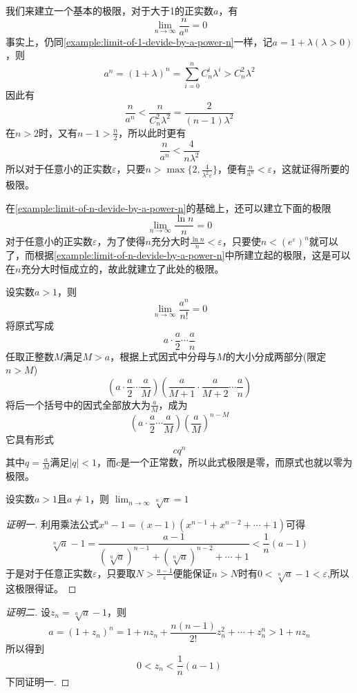 \begin{example}
  \label{example:limit-of-n-devide-by-a-power-n}
  我们来建立一个基本的极限，对于大于1的正实数$a$，有
  \[ \lim_{n \to \infty} \frac{n}{a^n} = 0 \]
  事实上，仍同\autoref{example:limit-of-1-devide-by-a-power-n}一样，记$a=1+\lambda(\lambda>0)$，则
  \[ a^n=(1+\lambda)^n=\sum_{i=0}^nC_n^i\lambda^i > C_n^2 \lambda^2 \]
  因此有
  \[ \frac{n}{a^n} < \frac{n}{C_n^2 \lambda^2} = \frac{2}{(n-1)\lambda^2} \]
  在$n>2$时，又有$n-1>\frac{n}{2}$，所以此时更有
  \[ \frac{n}{a^n} < \frac{4}{n\lambda^2} \]
  所以对于任意小的正实数$\varepsilon$，只要$n>\max\{2,\frac{4}{\lambda^2\varepsilon}\}$，便有$\frac{n}{a^n} < \varepsilon$，这就证得所要的极限。
\end{example}

\begin{example}
  \label{example:limit-of-lnn-devide-by-n}
  在\autoref{example:limit-of-n-devide-by-a-power-n}的基础上，还可以建立下面的极限
  \[ \lim_{n \to \infty} \frac{\ln{n}}{n} = 0 \]
  对于任意小的正实数$\varepsilon$，为了使得$n$充分大时$\frac{\ln{n}}{n} < \varepsilon$，只要使$n<(e^{\varepsilon})^n$就可以了，而根据\autoref{example:limit-of-n-devide-by-a-power-n}中所建立起的极限，这是可以在$n$充分大时恒成立的，故此就建立了此处的极限。
\end{example}

\begin{example}
  \label{example:limit-of-a-power-n-devide-by-n-fraction}
  设实数$a>1$，则
  \[ \lim_{n \to \infty} \frac{a^n}{n!} = 0 \]
  将原式写成
  \[ a \cdot \frac{a}{2} \cdots \frac{a}{n} \]
  任取正整数$M$满足$M>a$，根据上式因式中分母与$M$的大小分成两部分(限定$n>M$)
  \[ \left( a \cdot \frac{a}{2} \cdots \frac{a}{M} \right) \left( \frac{a}{M+1} \cdot \frac{a}{M+2} \cdots \frac{a}{n} \right) \]
  将后一个括号中的因式全部放大为$\frac{a}{M}$，成为
  \[ \left( a \cdot \frac{a}{2} \cdots \frac{a}{M} \right) \left( \frac{a}{M} \right)^{n-M} \]
  它具有形式
  \[ c q^n \]
  其中$q=\frac{a}{M}$满足$|q|<1$，而$c$是一个正常数，所以此式极限是零，而原式也就以零为极限。
\end{example}

\begin{example}
  \label{example:limit-of-n-sqrt-a-when-a-greater-than-1}
  设实数$a>1$且$a \neq 1$，则 $\lim_{n \to \infty} \sqrt[n]{a} = 1$

  \begin{proof}[证明一]
    利用乘法公式$x^n-1=(x-1)(x^{n-1}+x^{n-2}+\cdots+1)$可得
    \[ \sqrt[n]{a}-1 = \frac{a-1}{(\sqrt[n]{a})^{n-1}+(\sqrt[n]{a})^{n-2}+\cdots+1} < \frac{1}{n}(a-1) \]
   于是对于任意正实数$\varepsilon$，只要取$N>\frac{a-1}{\varepsilon}$便能保证$n>N$时有$0<\sqrt[n]{a}-1<\varepsilon$,所以这极限得证。
  \end{proof}

  \begin{proof}[证明二]
    设$z_n=\sqrt[n]{a}-1$，则
    \[ a = (1+z_n)^n = 1+ nz_n+\frac{n(n-1)}{2!}z_n^2+\cdots+z_n^n > 1+ n z_n \]
    所以得到
    \[ 0<z_n<\frac{1}{n}(a-1) \]
    下同证明一.
  \end{proof}
\end{example}

